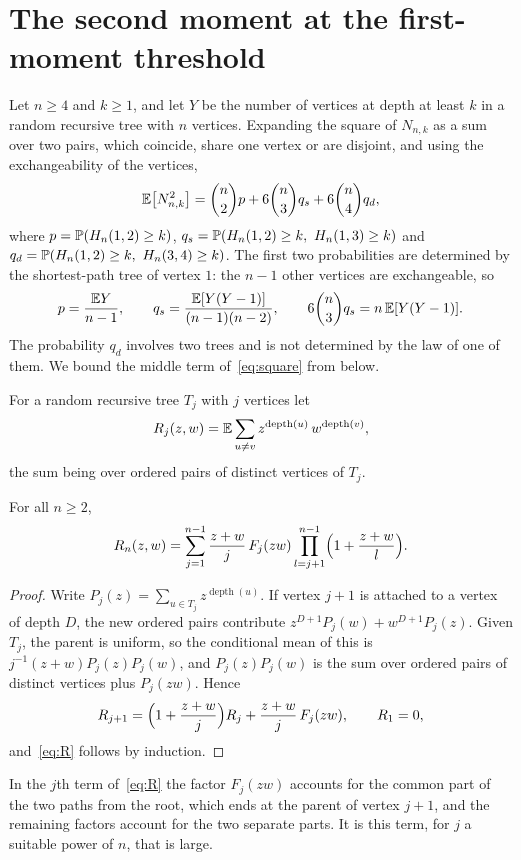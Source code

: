 \section{The second moment at the first-moment threshold}\label{sec:second}

Let $n\ge4$ and $k\ge1$, and let $Y$ be the number of vertices at depth at least $k$ in a random recursive tree with
$n$ vertices. Expanding the square of $N_{n,k}$ as a sum over two pairs, which coincide, share one vertex or are
disjoint, and using the exchangeability of the vertices,
\begin{equation}\label{eq:square}
\mathbb{E}\bigl[N_{n,k}^2\bigr]=\binom n2p+6\binom n3q_s+6\binom n4q_d ,
\end{equation}
where $p=\mathbb{P}(H_n(1,2)\ge k)$, $q_s=\Prob(H_n(1,2)\ge k,\ H_n(1,3)\ge k)$ and
$q_d=\mathbb{P}(H_n(1,2)\ge k,\ H_n(3,4)\ge k)$. The first two probabilities are determined by the shortest-path tree of
vertex $1$: the $n-1$ other vertices are exchangeable, so
\[
p=\frac{\mathbb{E} Y}{n-1},\qquad q_s=\frac{\mathbb{E}[Y(Y-1)]}{(n-1)(n-2)},\qquad 6\binom n3q_s=n\,\mathbb{E}[Y(Y-1)] .
\]
The probability $q_d$ involves two trees and is not determined by the law of one of them. We bound the middle term
of~\eqref{eq:square} from below.

For a random recursive tree $T_j$ with $j$ vertices let
\[
R_j(z,w)=\mathbb{E}\sum_{u\ne v}z^{\operatorname{depth}(u)}\,w^{\operatorname{depth}(v)},
\]
the sum being over ordered pairs of distinct vertices of $T_j$.

\begin{lemma}\label{lem:pairs}
For all $n\ge2$,
\begin{equation}\label{eq:R}
R_n(z,w)=\sum_{j=1}^{n-1}\frac{z+w}{j}\,F_j(zw)\prod_{l=j+1}^{n-1}\Bigl(1+\frac{z+w}{l}\Bigr).
\end{equation}
\end{lemma}

\begin{proof}
Write $P_j(z)=\sum_{u\in T_j}z^{\operatorname{depth}(u)}$. If vertex $j+1$ is attached to a vertex of depth $D$, the
new ordered pairs contribute $z^{D+1}P_j(w)+w^{D+1}P_j(z)$. Given $T_j$, the parent is uniform, so the conditional
mean of this is $j^{-1}(z+w)P_j(z)P_j(w)$, and $P_j(z)P_j(w)$ is the sum over ordered pairs of distinct vertices
plus $P_j(zw)$. Hence
\[
R_{j+1}=\Bigl(1+\frac{z+w}{j}\Bigr)R_j+\frac{z+w}{j}\,F_j(zw),\qquad R_1=0,
\]
and~\eqref{eq:R} follows by induction.
\end{proof}

In the $j$th term of~\eqref{eq:R} the factor $F_j(zw)$ accounts for the common part of the two paths from the root,
which ends at the parent of vertex $j+1$, and the remaining factors account for the two separate parts. It is this
term, for $j$ a suitable power of $n$, that is large.

